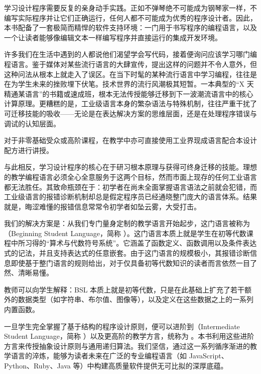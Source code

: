学习设计程序需要反复的亲身动手实践。正如不弹琴绝不可能成为钢琴家一样，不编写实际程序并让它们正确运行，任何人都不可能成为优秀的程序设计者。因此，本书配备了一套极简而精悍的软件支持环境：一门用于书写程序的编程语言，以及一个让读者能够像编辑文本一样编写程序并直接运行的集成开发环境。

许多我们在生活中遇到的人都说他们渴望学会写代码，接着便询问应该学习哪门编程语言。鉴于媒体对某些流行语言的大肆宣传，提出这样的问题并不令人意外，但这种问法从根本上就走入了误区。在当下时髦的某种流行语言中学习编程，往往是在为学生未来的挫败埋下伏笔。技术世界的流行风潮极其短暂。一本典型的“X 天精通某语言”的书籍或速成班，根本无法传授能够迁移到下一波潮流语言中的核心计算原理。更糟糕的是，工业级语言本身的繁杂语法与特殊机制，往往严重干扰了可迁移技能的吸收——无论是在表达解决方案的思维层面，还是在处理程序错误与调试的认知层面。

\begin{notebox}[教师建议]
对于非零基础受众或高阶课程，在教学中亦可直接使用工业界现成语言配合本设计配方进行讲授。
\end{notebox}

与此相反，学习设计程序的核心在于研习根本原理与获得可终身迁移的技能。理想的教学编程语言必须全心全意服务于这两个目标，然而市面上现存的任何工业语言都无法胜任。其致命瓶颈在于：初学者在尚未全面掌握语言语法之前就会犯错，而工业级语言的报错诊断机制却总是假定程序员已经通晓整门庞大的语言体系。结果就是，晦涩难懂的报错信息常常令初学者如坠云雾，大受打击。

我们的解决方案是：从我们专门量身定制的教学语言开始起步，这门语言被称为（Beginning Student Language，简称 ）。这门语言本质上就是学生在初等代数课程中所习得的“算术与代数符号系统”。它涵盖了函数定义、函数调用以及条件表达式的记法，并且支持表达式的任意嵌套。由于这门语言的规模极小，其报错诊断信息即使基于整门语言的规则给出，对于仅具备初等代数知识的读者而言依然一目了然、清晰易懂。

\begin{notebox}[教师建议]
教师可以向学生解释：BSL 本质上就是初等代数，只是在此基础上扩充了若干额外的数据类型（如字符串、布尔值、图像等），以及定义在这些数据之上的一系列内置函数。
\end{notebox}

一旦学生完全掌握了基于结构的程序设计原则，便可以进阶到（Intermediate Student Language，简称 ）以及更高阶的教学方言，统称为 。本书利用这些进阶方言来传授抽象设计原则与通用递归算法。我们坚信，通过这一系列循序渐进的教学语言的淬炼，能够为读者未来在广泛的专业编程语言（如 JavaScript、Python、Ruby、Java 等）中构建高质量软件提供无可比拟的深厚底蕴。


